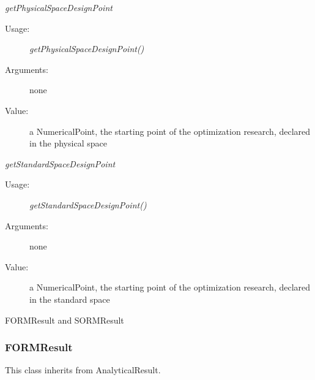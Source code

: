 \begin{description}
\begin{description}
\item \textit{getPhysicalSpaceDesignPoint}
\begin{description}
\item[Usage:] \textit{getPhysicalSpaceDesignPoint()}
\item[Arguments:] none
\item[Value:]  a NumericalPoint, the starting point of the optimization research, declared in the physical space
\end{description}
\bigskip
\item \textit{getStandardSpaceDesignPoint}
\begin{description}
\item[Usage:] \textit{getStandardSpaceDesignPoint()}
\item[Arguments:] none
\item[Value:]  a NumericalPoint, the starting point of the optimization research, declared in the standard space
\end{description}
\bigskip
\end{description}

\item[Derivative Classes :] FORMResult and SORMResult


\end{description}


\newpage
\subsubsection{FORMResult}

This class inherits from AnalyticalResult.

